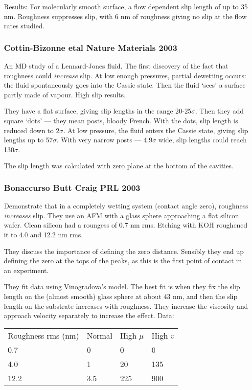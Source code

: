 \documentclass[twocolumn]{article}
\begin{document}
Results: For molecularly smooth surface, a flow dependent slip length of up to 35 nm. Roughness suppresses slip, with 6 nm of roughness giving no slip at the flow rates studied.

\subsubsection*{Cottin-Bizonne etal Nature Materials 2003}
An MD study of a Lennard-Jones fluid. The first discovery of the fact that roughness could \emph{increase} slip. At low enough pressures, partial dewetting occurs: the fluid spontaneously goes into the Cassie state. Then the fluid `sees' a surface partly made of vapour. High slip results.

They have a flat surface, giving slip lengths in the range 20-25$\sigma$. Then they add square `dots' --- they mean posts, bloody French. With the dots, slip length is reduced down to 2$\sigma$. At low pressure, the fluid enters the Cassie state, giving slip lengths up to 57$\sigma$. With very narrow posts --- 4.9$\sigma$ wide, slip lengths could reach 130$\sigma$.

The slip length was calculated with zero plane at the bottom of the cavities.


\subsubsection*{Bonaccurso Butt Craig PRL 2003}
Demonstrate that in a completely wetting system (contact angle zero), roughness \emph{increases} slip. They use an AFM with a glass sphere approaching a flat silicon wafer. Clean silicon had a roungess of 0.7 nm rms. Etching with KOH roughened it to 4.0 and 12.2 nm rms.

They discuss the importance of defining the zero distance. Sensibly they end up defining the zero at the tops of the peaks, as this is the first point of contact in an experiment.

They fit data using Vinogradova's model. The best fit is when they fix the slip length on the (almost smooth) glass sphere at about 43 nm, and then the slip length on the substrate increases with roughness. They increase the viscosity and approach velocity separately to increase the effect. Data:

\begin{tabular}{l l l l}

Roughness rms (nm) & Normal & High $\mu$ & High $v$ \\
0.7                & 0      & 0          & 0        \\
4.0                & 1      & 20         & 135      \\
12.2               & 3.5    & 225        & 900      \\

\end{tabular}
\end{document}
